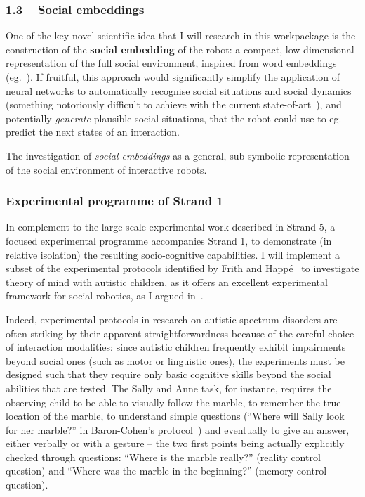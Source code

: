 \subsubsection{1.3 -- Social embeddings}

One of the key novel scientific idea that I will research in this workpackage is
the construction of the \textbf{social embedding} of the robot:
a compact, low-dimensional representation of the full social environment,
inspired from word embeddings (eg.~\parencite{mikolov2013distributed}). If fruitful,
this approach would significantly simplify the application of neural networks to
automatically recognise social situations and social dynamics (something notoriously difficult
to achieve with the current state-of-art~\parencite{bartlett2019what}), and
potentially \emph{generate} plausible social situations, that the robot could
use to eg. predict the next states of an interaction.

\begin{outcome}{1.3}
The investigation of \emph{social
    embeddings} as a general, sub-symbolic representation of the social
    environment of interactive robots.
\end{outcome}

\subsubsection{Experimental programme of Strand 1}

In complement to the large-scale experimental work described in Strand 5, a focused experimental programme accompanies Strand 1, to demonstrate (in relative
isolation) the resulting socio-cognitive capabilities. I will implement a subset
of the experimental protocols identified by Frith and
Happé~\parencite{frith1994autism} to investigate theory of mind with autistic
children, as it offers an excellent experimental framework for social
robotics, as I argued in~\parencite{lemaignan2015mutual}.

Indeed, experimental protocols in research on autistic spectrum disorders are often
striking by their apparent straightforwardness because of the careful choice of
interaction modalities: since autistic children frequently exhibit impairments
beyond social ones (such as motor or linguistic ones), the experiments must be
designed such that they require only basic cognitive skills beyond the social
abilities that are tested. The Sally and Anne task, for instance, requires the
observing child to be able to visually follow the marble, to remember the true
location of the marble, to understand simple questions (``Where will Sally look
for her marble?'' in Baron-Cohen's protocol~\parencite{baron1985does}) and eventually
to give an answer, either verbally or with a gesture -- the two first points
being actually explicitly checked through questions: ``Where is the marble
really?'' (reality control question) and ``Where was the marble in the
beginning?'' (memory control question).

